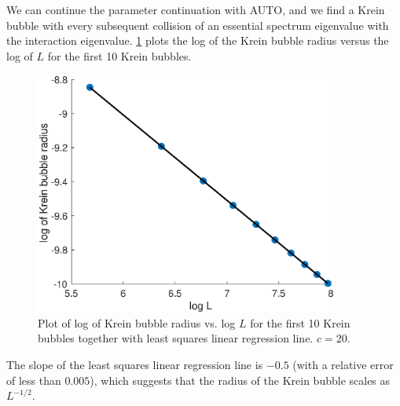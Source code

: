 \documentclass[thesis2.tex]{subfiles}
\begin{document}
We can continue the parameter continuation with AUTO, and we find a Krein bubble with every subsequent collision of an essential spectrum eigenvalue with the interaction eigenvalue. \cref{fig:kreinbubbleradius} plots the log of the Krein bubble radius versus the log of $L$ for the first 10 Krein bubbles.
\begin{figure}
\includegraphics[width=10cm]{images/kdv5numerics/kreinbubbleradius}
\caption[Krein bubble radius for KdV5]{Plot of log of Krein bubble radius vs. log $L$ for the first 10 Krein bubbles together with least squares linear regression line. $c = 20$.}
\label{fig:kreinbubbleradius}
\end{figure}
The slope of the least squares linear regression line is $-0.5$ (with a relative error of less than $0.005$), which suggests that the radius of the Krein bubble scales as $L^{-1/2}$.

\iffulldocument\else
	
	
\fi
\end{document}
